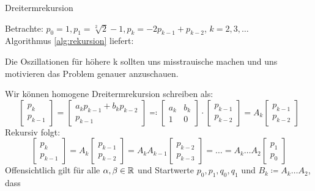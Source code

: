 \begin{algorithm}[H]
\label{alg:rekursion}
 \caption{Dreitermrekursion}
 \end{algorithm}
 \begin{example}
	 \label{eg:rekursion}
 Betrachte: $p_0=1, p_1=\sqrt[2]{2}-1, p_k= -2p_{k-1}+p_{k-2}$, $k=2,3,\ldots$ \\
 Algorithmus \ref{alg:rekursion} liefert:


Die Oszillationen für höhere k sollten uns misstrauische machen und uns motivieren das Problem genauer anzuschauen.
 \end{example}
Wir können homogene Dreitermrekursion schreiben als:
\[
\begin{bmatrix}
	p_k \\
	p_{k-1}
\end{bmatrix}= \begin{bmatrix}
a_kp_{k-1} + b_kp_{k-2} \\
p_{k-1}
\end{bmatrix} \eqqcolon \begin{bmatrix}
a_k & b_k \\
1 & 0
\end{bmatrix} \cdot \begin{bmatrix}
p_{k-1} \\
p_{k-2}
\end{bmatrix} = A_k \begin{bmatrix}
p_{k-1} \\
p_{k-2}
\end{bmatrix}
\]
Rekursiv folgt:
\[
\begin{bmatrix}
p_k \\
p_{k-1}\end{bmatrix} = A_k \begin{bmatrix}
p_{k-1} \\
p_{k-2}
\end{bmatrix}= A_k A_{k-1} \begin{bmatrix}
p_{k-2} \\
p_{k-3}
\end{bmatrix}= \ldots = A_k \ldots A_2 \begin{bmatrix}
p_1 \\
p_0
\end{bmatrix}
\]
Offensichtlich gilt für alle $\alpha, \beta \in \mathbb{R}$ und Startwerte $p_0,p_1,q_0,q_1$ und $B_k \coloneqq A_k \ldots A_2$, dass
